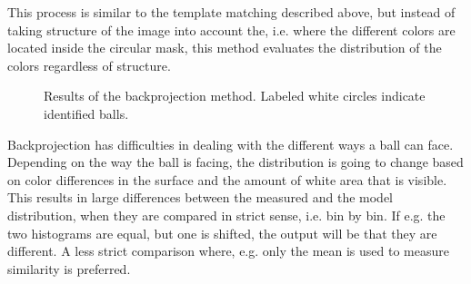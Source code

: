 This process is similar to the template matching described above, but instead of taking structure of the image into account the, i.e. where the different colors are located inside the circular mask, this method evaluates the distribution of the colors regardless of structure.
\begin{figure}[htpb]
  \centering
  \quad           
   \caption{Results of the backprojection method. Labeled white circles indicate identified balls.}
  \label{fig:backprojectResults}
\end{figure}
Backprojection has difficulties in dealing with the different ways a ball can face. Depending on the way the ball is facing, the distribution is going to change based on color differences in the surface and the amount of white area that is visible. This results in large differences between the measured and the model distribution, when they are compared in strict sense, i.e. bin by bin. If e.g. the two histograms are equal, but one is shifted, the output will be that they are different. A less strict comparison where, e.g. only the mean is used to measure similarity is preferred.

